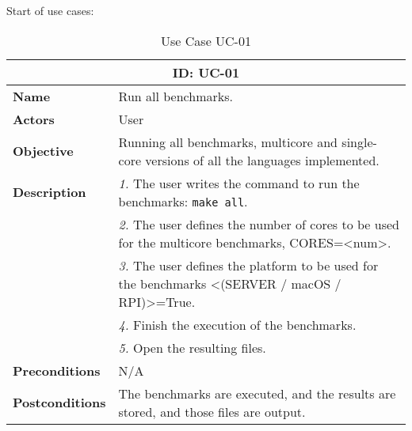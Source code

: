 Start of use cases:
\begin{table}[H]
    \centering
    \begin{tabular}{l p{10cm}}
        \toprule
        \multicolumn{2}{c}{\textbf{ID: UC-01}} \\
        \toprule
        \textbf{Name}                         &  Run all benchmarks. \\
        \textbf{Actors}                       &  User \\
        \textbf{Objective}                    &  Running all benchmarks, multicore and single-core versions of all the languages implemented. \\
        \multirow{1}{*}{\textbf{Description}} & \textsl{1.} The user writes the command to run the benchmarks: \texttt{make all}.\\
                                              & \textsl{2.} The user defines the number of cores to be used for the multicore benchmarks, CORES=<num>.\\
                                              & \textsl{3.} The user defines the platform to be used for the benchmarks <(SERVER / macOS / RPI)>=True.\\
                                              & \textsl{4.} Finish the execution of the benchmarks.\\
                                              & \textsl{5.} Open the resulting files.\\
        \textbf{Preconditions}                &  N/A \\
        \textbf{Postconditions}               &  The benchmarks are executed, and the results are stored, and those files are output. \\
    \end{tabular}
    \caption{Use Case UC-01}
    \label{tab:uc-01}
\end{table}


